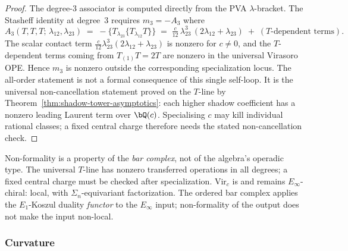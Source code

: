 \begin{proof}
The degree-$3$ associator is computed directly from the PVA
$\lambda$-bracket. The Stasheff identity at degree~$3$ requires
$m_3 = -A_3$ where
\[
A_3(T,T,T;\,\lambda_{12},\lambda_{23})
\;=\;
-\{T{}_{\lambda_{23}}\{T{}_{\lambda_{12}} T\}\}
\;=\;
\tfrac{c}{12}\,\lambda_{23}^3\,(2\lambda_{12} + \lambda_{23})
\;+\;(\text{$T$-dependent terms}).
\]
The scalar contact term $\frac{c}{12}\lambda_{23}^3(2\lambda_{12}
+ \lambda_{23})$ is nonzero for $c \neq 0$, and the $T$-dependent
terms coming from $T_{(1)}T=2T$ are nonzero in the universal Virasoro
OPE. Hence $m_3$ is nonzero outside the corresponding specialization
locus. The all-order statement is not a formal consequence of this
single self-loop. It is the universal non-cancellation statement proved
on the $T$-line by Theorem~\ref{thm:shadow-tower-asymptotics}: each
higher shadow coefficient has a nonzero leading Laurent term over
$\bQ(c)$. Specialising $c$ may kill individual rational classes; a
fixed central charge therefore needs the stated non-cancellation check.
\end{proof}

\begin{remark}
\label{rem:non-formality-not-E1}
Non-formality is a property of the \emph{bar complex}, not of the
algebra's operadic type. The universal $T$-line has nonzero transferred
operations in all degrees; a fixed central charge must be checked after
specialization.
$\mathrm{Vir}_c$ is and remains $E_\infty$-chiral: local, with
$\Sigma_n$-equivariant factorization. The ordered bar complex
applies the $E_1$-Koszul duality \emph{functor} to the $E_\infty$
input; non-formality of the output does not make the input non-local.
\end{remark}

\subsubsection*{Curvature}

